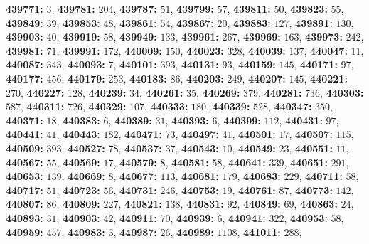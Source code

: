 \textsf{\bfseries 439771:} $3$, \textsf{\bfseries 439781:} $204$, \textsf{\bfseries 439787:} $51$, \textsf{\bfseries 439799:} $57$, \textsf{\bfseries 439811:} $50$, \textsf{\bfseries 439823:} $55$, \textsf{\bfseries 439849:} $39$, \textsf{\bfseries 439853:} $48$, \textsf{\bfseries 439861:} $54$, \textsf{\bfseries 439867:} $20$, \textsf{\bfseries 439883:} $127$, \textsf{\bfseries 439891:} $130$, \textsf{\bfseries 439903:} $40$, \textsf{\bfseries 439919:} $58$, \textsf{\bfseries 439949:} $133$, \textsf{\bfseries 439961:} $267$, \textsf{\bfseries 439969:} $163$, \textsf{\bfseries 439973:} $242$, \textsf{\bfseries 439981:} $71$, \textsf{\bfseries 439991:} $172$, \textsf{\bfseries 440009:} $150$, \textsf{\bfseries 440023:} $328$, \textsf{\bfseries 440039:} $137$, \textsf{\bfseries 440047:} $11$, \textsf{\bfseries 440087:} $343$, \textsf{\bfseries 440093:} $7$, \textsf{\bfseries 440101:} $393$, \textsf{\bfseries 440131:} $93$, \textsf{\bfseries 440159:} $145$, \textsf{\bfseries 440171:} $97$, \textsf{\bfseries 440177:} $456$, \textsf{\bfseries 440179:} $253$, \textsf{\bfseries 440183:} $86$, \textsf{\bfseries 440203:} $249$, \textsf{\bfseries 440207:} $145$, \textsf{\bfseries 440221:} $270$, \textsf{\bfseries 440227:} $128$, \textsf{\bfseries 440239:} $34$, \textsf{\bfseries 440261:} $35$, \textsf{\bfseries 440269:} $379$, \textsf{\bfseries 440281:} $736$, \textsf{\bfseries 440303:} $587$, \textsf{\bfseries 440311:} $726$, \textsf{\bfseries 440329:} $107$, \textsf{\bfseries 440333:} $180$, \textsf{\bfseries 440339:} $528$, \textsf{\bfseries 440347:} $350$, \textsf{\bfseries 440371:} $18$, \textsf{\bfseries 440383:} $6$, \textsf{\bfseries 440389:} $31$, \textsf{\bfseries 440393:} $6$, \textsf{\bfseries 440399:} $112$, \textsf{\bfseries 440431:} $97$, \textsf{\bfseries 440441:} $41$, \textsf{\bfseries 440443:} $182$, \textsf{\bfseries 440471:} $73$, \textsf{\bfseries 440497:} $41$, \textsf{\bfseries 440501:} $17$, \textsf{\bfseries 440507:} $115$, \textsf{\bfseries 440509:} $393$, \textsf{\bfseries 440527:} $78$, \textsf{\bfseries 440537:} $37$, \textsf{\bfseries 440543:} $10$, \textsf{\bfseries 440549:} $23$, \textsf{\bfseries 440551:} $11$, \textsf{\bfseries 440567:} $55$, \textsf{\bfseries 440569:} $17$, \textsf{\bfseries 440579:} $8$, \textsf{\bfseries 440581:} $58$, \textsf{\bfseries 440641:} $339$, \textsf{\bfseries 440651:} $291$, \textsf{\bfseries 440653:} $139$, \textsf{\bfseries 440669:} $8$, \textsf{\bfseries 440677:} $113$, \textsf{\bfseries 440681:} $179$, \textsf{\bfseries 440683:} $229$, \textsf{\bfseries 440711:} $58$, \textsf{\bfseries 440717:} $51$, \textsf{\bfseries 440723:} $56$, \textsf{\bfseries 440731:} $246$, \textsf{\bfseries 440753:} $19$, \textsf{\bfseries 440761:} $87$, \textsf{\bfseries 440773:} $142$, \textsf{\bfseries 440807:} $86$, \textsf{\bfseries 440809:} $227$, \textsf{\bfseries 440821:} $138$, \textsf{\bfseries 440831:} $92$, \textsf{\bfseries 440849:} $69$, \textsf{\bfseries 440863:} $24$, \textsf{\bfseries 440893:} $31$, \textsf{\bfseries 440903:} $42$, \textsf{\bfseries 440911:} $70$, \textsf{\bfseries 440939:} $6$, \textsf{\bfseries 440941:} $322$, \textsf{\bfseries 440953:} $58$, \textsf{\bfseries 440959:} $457$, \textsf{\bfseries 440983:} $3$, \textsf{\bfseries 440987:} $26$, \textsf{\bfseries 440989:} $1108$, \textsf{\bfseries 441011:} $288$, 
